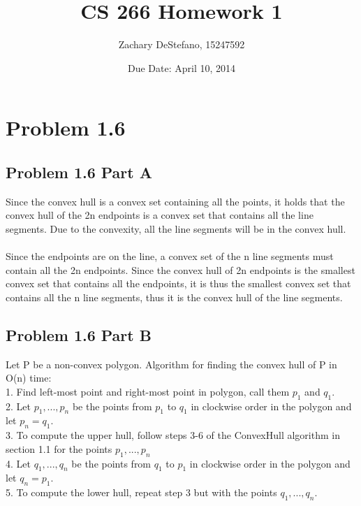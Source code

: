 \documentclass[11pt,psfig]{article}
\begin{document}
\setlength{\parskip}{1.2ex plus0.3ex minus 0.3ex}


\thispagestyle{empty} \pagestyle{myheadings} 



\title{CS 266 Homework 1}
\author{Zachary DeStefano, 15247592}
\date{Due Date: April 10, 2014}

\maketitle

\vfill\eject

\section*{Problem 1.6}

\subsection*{Problem 1.6 Part A}

Since the convex hull is a convex set containing all the points, it holds that the convex hull of the 2n endpoints is a convex set that contains all the line segments. Due to the convexity, all the line segments will be in the convex hull. 
\\
\\
Since the endpoints are on the line, a convex set of the n line segments must contain all the 2n endpoints. Since the convex hull of 2n endpoints is the smallest convex set that contains all the endpoints, it is thus the smallest convex set that contains all the n line segments, thus it is the convex hull of the line segments. 

\subsection*{Problem 1.6 Part B}

Let P be a non-convex polygon. Algorithm for finding the convex hull of P in O(n) time:
\\
1. Find left-most point and right-most point in polygon, call them $p_1$ and $q_1$. \\
2. Let $p_1,...,p_n$ be the points from $p_1$ to $q_1$ in clockwise order in the polygon and let $p_n=q_1$. \\
3. To compute the upper hull, follow steps 3-6 of the ConvexHull algorithm in section 1.1 for the points $p_1,...,p_n$\\
4. Let $q_1,...,q_n$ be the points from $q_1$ to $p_1$ in clockwise order in the polygon and let $q_n=p_1$. \\
5. To compute the lower hull, repeat step 3 but with the points $q_1,...,q_n$.\\
\end{document}
